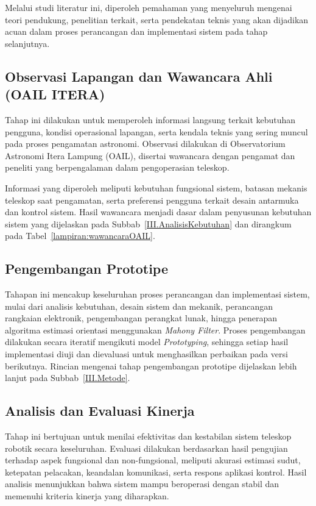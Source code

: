 Melalui studi literatur ini, diperoleh pemahaman yang menyeluruh mengenai teori pendukung, penelitian terkait, serta pendekatan teknis yang akan dijadikan acuan dalam proses perancangan dan implementasi sistem pada tahap selanjutnya. \par
\subsection{Observasi Lapangan dan Wawancara Ahli (OAIL ITERA)} \label{III.Langkah2}

Tahap ini dilakukan untuk memperoleh informasi langsung terkait kebutuhan pengguna, kondisi operasional lapangan, serta kendala teknis yang sering muncul pada proses pengamatan astronomi. Observasi dilakukan di Observatorium Astronomi Itera Lampung (OAIL), disertai wawancara dengan pengamat dan peneliti yang berpengalaman dalam pengoperasian teleskop.

Informasi yang diperoleh meliputi kebutuhan fungsional sistem, batasan mekanis teleskop saat pengamatan, serta preferensi pengguna terkait desain antarmuka dan kontrol sistem. Hasil wawancara menjadi dasar dalam penyusunan kebutuhan sistem yang dijelaskan pada Subbab~\ref{III.AnalisisKebutuhan} dan dirangkum pada Tabel~\ref{lampiran:wawancaraOAIL}.

\subsection{Pengembangan Prototipe}
Tahapan ini mencakup keseluruhan proses perancangan dan implementasi sistem, mulai dari analisis kebutuhan, desain sistem dan mekanik, perancangan rangkaian elektronik, pengembangan perangkat lunak, hingga penerapan algoritma estimasi orientasi menggunakan \textit{Mahony Filter}.  
Proses pengembangan dilakukan secara iteratif mengikuti model \textit{Prototyping}, sehingga setiap hasil implementasi diuji dan dievaluasi untuk menghasilkan perbaikan pada versi berikutnya.  
Rincian mengenai tahap pengembangan prototipe dijelaskan lebih lanjut pada Subbab~\ref{III.Metode}.

\subsection{Analisis dan Evaluasi Kinerja} \label{III.Langkah9}
Tahap ini bertujuan untuk menilai efektivitas dan kestabilan sistem teleskop robotik secara keseluruhan. Evaluasi dilakukan berdasarkan hasil pengujian terhadap aspek fungsional dan non-fungsional, meliputi akurasi estimasi sudut, ketepatan pelacakan, keandalan komunikasi, serta respons aplikasi kontrol. Hasil analisis menunjukkan bahwa sistem mampu beroperasi dengan stabil dan memenuhi kriteria kinerja yang diharapkan.


